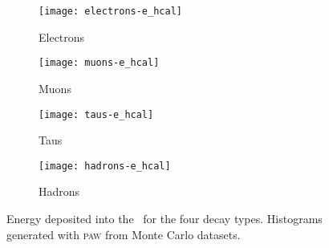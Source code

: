 \begin{figure}
    \centering
    \begin{subfigure}[c]{0.48\linewidth}
        \centering
        \texttt{[image: electrons-e\_hcal]}
        \caption{%
            Electrons
        }
        \label{fig:paw-e_hcal/electrons}
    \end{subfigure}
    \hfill
    \begin{subfigure}[c]{0.48\linewidth}
        \centering
        \texttt{[image: muons-e\_hcal]}
        \caption{%
            Muons
        }
        \label{fig:paw-e_hcal/muons}
    \end{subfigure}

    \vspace{2ex}

    \begin{subfigure}[c]{0.48\linewidth}
        \centering
        \texttt{[image: taus-e\_hcal]}
        \caption{%
            Taus
        }
        \label{fig:paw-e_hcal/taus}
    \end{subfigure}
    \hfill
    \begin{subfigure}[c]{0.48\linewidth}
        \centering
        \texttt{[image: hadrons-e\_hcal]}
        \caption{%
            Hadrons
        }
        \label{fig:paw-e_hcal/hadrons}
    \end{subfigure}
    \caption{%
        Energy deposited into the \hcal\ for the four decay types.
        Histograms generated with \textsc{paw} from Monte Carlo datasets.
    }
    \label{fig:paw-e_hcal}
\end{figure}
